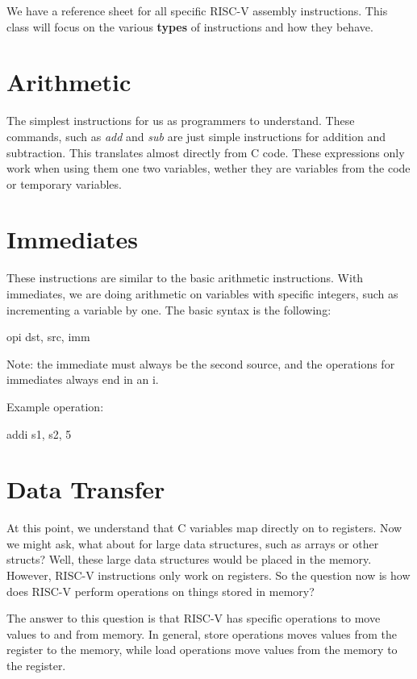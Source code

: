 \documentclass[letterpaper]{article}
\theoremstyle{remark}
\begin{document}
We have a reference sheet for all specific RISC-V assembly instructions. This class will focus on the various \textbf{types} of instructions and how they behave.

\section{Arithmetic}
The simplest instructions for us as programmers to understand. These commands, such as \textit{add} and \textit{sub} are just simple instructions for addition and subtraction. This translates almost directly from C code. These expressions only work when using them one two variables, wether they are variables from the code or temporary variables.

\section{Immediates}
These instructions are similar to the basic arithmetic instructions. With immediates, we are doing arithmetic on variables with specific integers, such as incrementing a variable by one. The basic syntax is the following:

\begin{center}
opi dst, src, imm
\end{center}

Note: the immediate must always be the second source, and the operations for immediates always end in an i.

Example operation:

\begin{center}
addi s1, s2, 5
\end{center}

\section{Data Transfer}
At this point, we understand that C variables map directly on to registers. Now we might ask, what about for large data structures, such as arrays or other structs? Well, these large data structures would be placed in the memory. However, RISC-V instructions only work on registers. So the question now is how does RISC-V perform operations on things stored in memory?

The answer to this question is that RISC-V has specific operations to move values to and from memory. In general, store operations moves values from the register to the memory, while load operations move values from the memory to the register.
\end{document}
